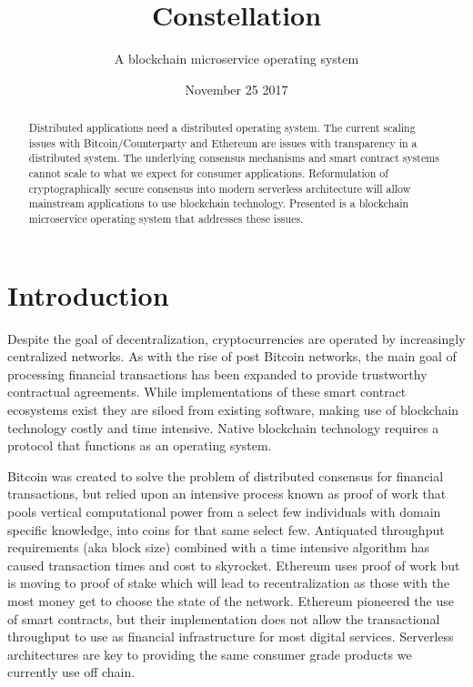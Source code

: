\documentclass{article}
\title{Constellation}
\author{A blockchain microservice operating system}
\date{November 25 2017}
\begin{document}
\maketitle

\begin{abstract}
Distributed applications need a distributed operating system. The current scaling issues with Bitcoin/Counterparty and Ethereum are issues with transparency in a distributed system. The underlying consensus mechanisms and smart contract systems cannot scale to what we expect for consumer applications. Reformulation of cryptographically secure consensus into modern serverless architecture will allow mainstream applications to use blockchain technology. Presented is a blockchain microservice operating system that addresses these issues.\

\end{abstract}
\setcounter{secnumdepth}{0}
\section{Introduction}
Despite the goal of decentralization, cryptocurrencies are operated by increasingly centralized networks. As with the rise of post Bitcoin networks, the main goal of processing financial transactions has been expanded to provide trustworthy contractual agreements. While implementations of these smart contract ecosystems exist they are siloed from existing software, making use of blockchain technology costly and time intensive. Native blockchain technology requires a protocol that functions as an operating system. 

Bitcoin was created to solve the problem of distributed consensus for financial transactions, but relied upon an intensive process known as proof of work that pools vertical computational power from a select few individuals with domain specific knowledge, into coins for that same select few. Antiquated throughput requirements (aka block size) combined with a time intensive algorithm has caused transaction times and cost to skyrocket. Ethereum uses proof of work but is moving to proof of stake which will lead to recentralization as those with the most money get to choose the state of the network. Ethereum pioneered the use of smart contracts, but their implementation does not allow the transactional throughput to use as financial infrastructure for most digital services. Serverless architectures are key to providing the same consumer grade products we currently use off chain.
\end{document}
